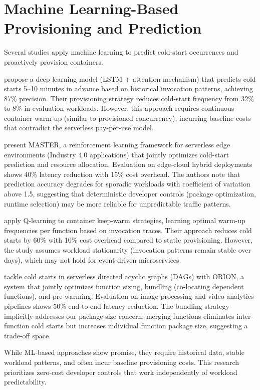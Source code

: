 \section{Machine Learning-Based Provisioning and Prediction}

Several studies apply machine learning to predict cold-start occurrences and proactively provision containers.

\citet{saravanakumar2025prediction} propose a deep learning model (LSTM + attention mechanism) that predicts cold starts 5–10 minutes in advance based on historical invocation patterns, achieving 87\% precision. Their provisioning strategy reduces cold-start frequency from 32\% to 8\% in evaluation workloads. However, this approach requires continuous container warm-up (similar to provisioned concurrency), incurring baseline costs that contradict the serverless pay-per-use model.

\citet{golec2024master} present MASTER, a reinforcement learning framework for serverless edge environments (Industry 4.0 applications) that jointly optimizes cold-start prediction and resource allocation. Evaluation on edge-cloud hybrid deployments shows 40\% latency reduction with 15\% cost overhead. The authors note that prediction accuracy degrades for sporadic workloads with coefficient of variation above 1.5, suggesting that deterministic developer controls (package optimization, runtime selection) may be more reliable for unpredictable traffic patterns.

\citet{vahidinia2023mitigating} apply Q-learning to container keep-warm strategies, learning optimal warm-up frequencies per function based on invocation traces. Their approach reduces cold starts by 60\% with 10\% cost overhead compared to static provisioning. However, the study assumes workload stationarity (invocation patterns remain stable over days), which may not hold for event-driven microservices.

\citet{mahgoub2022orion} tackle cold starts in serverless directed acyclic graphs (DAGs) with ORION, a system that jointly optimizes function sizing, bundling (co-locating dependent functions), and pre-warming. Evaluation on image processing and video analytics pipelines shows 50\% end-to-end latency reduction. The bundling strategy implicitly addresses our package-size concern: merging functions eliminates inter-function cold starts but increases individual function package size, suggesting a trade-off space.

While ML-based approaches show promise, they require historical data, stable workload patterns, and often incur baseline provisioning costs. This research prioritizes zero-cost developer controls that work independently of workload predictability.

